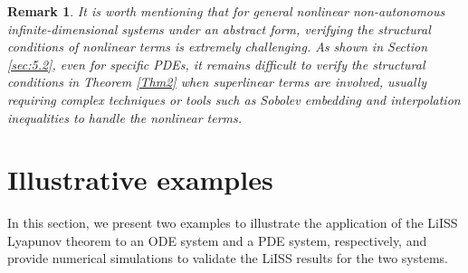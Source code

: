 \documentclass[onecolumn]{autart}
\newtheorem{remark}{Remark}
\newenvironment{proof of Prop.ODE}{{\it Proof of Proposition~\ref{Prop.ODE}:\enspace}}{\hfill $\blacksquare$\par}
\newenvironment{proof of PDE}{{\it Proof of Proposition \ref{Prop.8}:\enspace}}{\hfill $\blacksquare$\par}
\begin{document}
{\begin{remark}
It is worth mentioning that for general nonlinear non-autonomous infinite-dimensional systems under an abstract form, verifying the  structural conditions of nonlinear terms is extremely challenging. As shown in Section \ref{sec:5.2}, even for specific PDEs,  it remains difficult to verify  the structural conditions in Theorem \ref{Thm2} when  superlinear terms are involved, usually requiring complex     techniques or  tools such as Sobolev embedding  and interpolation inequalities  to handle the nonlinear terms.
\end{remark}
%
%
%
%
%
%


\section{Illustrative examples}\label{sec:5}

In this section, we present two examples to illustrate the application of the LiISS Lyapunov theorem to an ODE system and a PDE
system, respectively, and provide numerical simulations to validate the LiISS results for the two systems.

}
\end{document}
